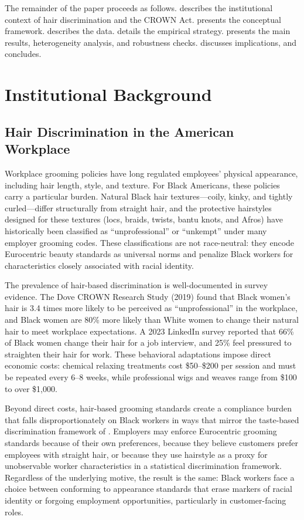 \documentclass[12pt]{article}
\begin{document}
The remainder of the paper proceeds as follows.  describes the institutional context of hair discrimination and the CROWN Act.  presents the conceptual framework.  describes the data.  details the empirical strategy.  presents the main results, heterogeneity analysis, and robustness checks.  discusses implications, and  concludes.

\section{Institutional Background}\label{sec:background}

\subsection{Hair Discrimination in the American Workplace}

Workplace grooming policies have long regulated employees' physical appearance, including hair length, style, and texture. For Black Americans, these policies carry a particular burden. Natural Black hair textures---coily, kinky, and tightly curled---differ structurally from straight hair, and the protective hairstyles designed for these textures (locs, braids, twists, bantu knots, and Afros) have historically been classified as ``unprofessional'' or ``unkempt'' under many employer grooming codes. These classifications are not race-neutral: they encode Eurocentric beauty standards as universal norms and penalize Black workers for characteristics closely associated with racial identity.

The prevalence of hair-based discrimination is well-documented in survey evidence. The Dove CROWN Research Study (2019) found that Black women's hair is 3.4 times more likely to be perceived as ``unprofessional'' in the workplace, and Black women are 80\% more likely than White women to change their natural hair to meet workplace expectations. A 2023 LinkedIn survey reported that 66\% of Black women change their hair for a job interview, and 25\% feel pressured to straighten their hair for work. These behavioral adaptations impose direct economic costs: chemical relaxing treatments cost \$50--\$200 per session and must be repeated every 6--8 weeks, while professional wigs and weaves range from \$100 to over \$1,000.

Beyond direct costs, hair-based grooming standards create a compliance burden that falls disproportionately on Black workers in ways that mirror the taste-based discrimination framework of \citet{becker1957}. Employers may enforce Eurocentric grooming standards because of their own preferences, because they believe customers prefer employees with straight hair, or because they use hairstyle as a proxy for unobservable worker characteristics in a \citet{phelps1972} statistical discrimination framework. Regardless of the underlying motive, the result is the same: Black workers face a choice between conforming to appearance standards that erase markers of racial identity or forgoing employment opportunities, particularly in customer-facing roles.
\end{document}
